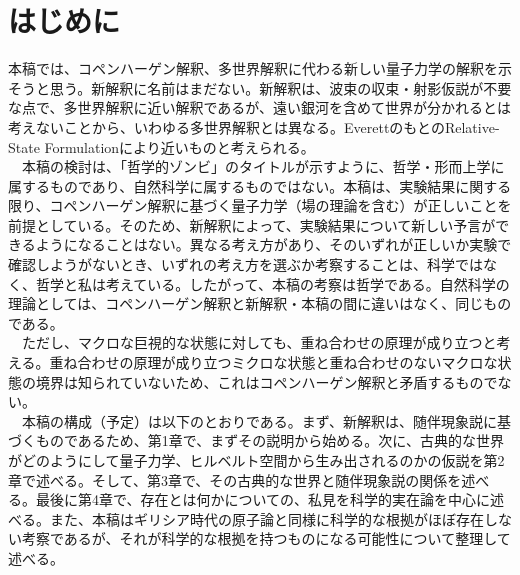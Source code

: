 \section*{はじめに}
本稿では、コペンハーゲン解釈、多世界解釈に代わる新しい量子力学の解釈を示そうと思う。新解釈に名前はまだない。新解釈は、波束の収束・射影仮説が不要な点で、多世界解釈に近い解釈であるが、遠い銀河を含めて世界が分かれるとは考えないことから、いわゆる多世界解釈とは異なる。EverettのもとのRelative-State Formulationにより近いものと考えられる。\\
　本稿の検討は、「哲学的ゾンビ」のタイトルが示すように、哲学・形而上学に属するものであり、自然科学に属するものではない。本稿は、実験結果に関する限り、コペンハーゲン解釈に基づく量子力学（場の理論を含む）が正しいことを前提としている。そのため、新解釈によって、実験結果について新しい予言ができるようになることはない。異なる考え方があり、そのいずれが正しいか実験で確認しようがないとき、いずれの考え方を選ぶか考察することは、科学ではなく、哲学と私は考えている。したがって、本稿の考察は哲学である。自然科学の理論としては、コペンハーゲン解釈と新解釈・本稿の間に違いはなく、同じものである。\\
　ただし、マクロな巨視的な状態に対しても、重ね合わせの原理が成り立つと考える。重ね合わせの原理が成り立つミクロな状態と重ね合わせのないマクロな状態の境界は知られていないため、これはコペンハーゲン解釈と矛盾するものでない。\\
　本稿の構成（予定）は以下のとおりである。まず、新解釈は、随伴現象説に基づくものであるため、第1章で、まずその説明から始める。次に、古典的な世界がどのようにして量子力学、ヒルベルト空間から生み出されるのかの仮説を第2章で述べる。そして、第3章で、その古典的な世界と随伴現象説の関係を述べる。最後に第4章で、存在とは何かについての、私見を科学的実在論を中心に述べる。また、本稿はギリシア時代の原子論と同様に科学的な根拠がほぼ存在しない考察であるが、それが科学的な根拠を持つものになる可能性について整理して述べる。